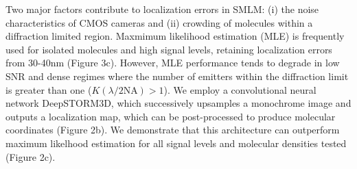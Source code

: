 \documentclass{ucetd}
\begin{document}
Two major factors contribute to localization errors in SMLM: (i) the noise characteristics of CMOS cameras and (ii) crowding of molecules within a diffraction limited region. Maxmimum likelihood estimation (MLE) is frequently used for isolated molecules and high signal levels, retaining localization errors from 30-40nm (Figure 3c). However, MLE performance tends to degrade in low SNR and dense regimes where the number of emitters within the diffraction limit is greater than one ($K(\lambda/2\mathrm{NA}) > 1$). We employ a convolutional neural network DeepSTORM3D, which successively upsamples a monochrome image and outputs a localization map, which can be post-processed to produce molecular coordinates (Figure 2b).  We demonstrate that this architecture can outperform maximum likelhood estimation for all signal levels and molecular densities tested (Figure 2c).

\end{document}
